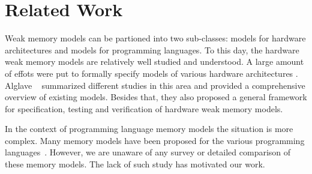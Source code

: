 \section{Related Work}

Weak memory models can be partioned into two sub-classes: 
models for hardware architectures and models for programming languages. 
To this day, the hardware weak memory models are relatively well studied and understood.
A large amount of effots were put to formally specify models of various 
hardware architectures%
\cite{Chong-ASPLOS08, Alglave-DAMP09, Sewell-al:CACM10, Sarkar-al:PLDI11, Flur-al:POPL16, Pulte-al:POPL18}.
Alglave \etal~\cite{Alglave-al:TOPLAS14} summarized different studies in this area 
and provided a comprehensive overview of existing models.  
Besides that, they also proposed a general framework for specification, 
testing and verification of hardware weak memory models.

In the context of programming language memory models the situation is more complex. 
Many memory models have been proposed for the various programming languages~\cite{
Manson-al:POPL05, Batty-al:POPL11, Batty-al:POPL16, 
Dolan-al:PLDI18, Watt-al:OOPSLA19, Watt-al:PLDI2020, 
Jeffrey-Riely:LICS16, PichonPharabod-Sewell:POPL16, 
Podkopaev-al:CoRR16, Kang-al:POPL17, Chakraborty-Vafeiadis:POPL19, 
Paviotti-al:ESOP20, Lee-al:PLDI20}.
However, we are unaware of any survey or detailed comparison of these memory models.
The lack of such study has motivated our work.

